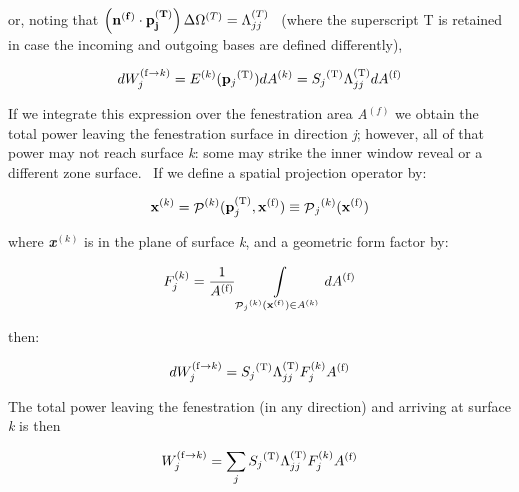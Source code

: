 or, noting that \(\left(\bf{n}^{(f)}\cdot\bf{p}_j^{(T)}\right) \Delta\Omega^{(T)} = \Lambda_{jj}^{(T)}\) ~(where the superscript T is retained in case the incoming and outgoing bases are defined differently),

\begin{equation}
dW_j^{{\rm{(f}} \to k{\rm{)}}} = {E^{{\rm{(}}k{\rm{)}}}}({{\bf{p}}_j}^{{\rm{(T)}}})d{A^{{\rm{(}}k{\rm{)}}}} = {S_j}^{{\rm{(T)}}}\Lambda_{jj}^{{\rm{(T)}}}d{A^{{\rm{(f)}}}}
\end{equation}

If we integrate this expression over the fenestration area \emph{A}\(^{(f)}\) we obtain the total power leaving the fenestration surface in direction \emph{j}; however, all of that power may not reach surface \emph{k}: some may strike the inner window reveal or a different zone surface.~ If we define a spatial projection operator by:

\begin{equation}
{{\bf{x}}^{{\rm{(}}k{\rm{)}}}} = {{\mathop{\rm \mathcal{P}}\nolimits} ^{{\rm{(}}k{\rm{)}}}}({\bf{p}}_j^{{\rm{(T)}}},{{\bf{x}}^{{\rm{(f)}}}}) \equiv {{\mathop{\rm \mathcal{P}}\nolimits}_j}^{{\rm{(}}k{\rm{)}}}({{\bf{x}}^{{\rm{(f)}}}})
\end{equation}

where \textbf{\emph{x}}\(^{(k)}\) is in the plane of surface \emph{k}, and a geometric form factor by:

\begin{equation}
F_j^{{\rm{(}}k{\rm{)}}} = \frac{1}{{{A^{{\rm{(f)}}}}}}\int\limits_{{{\mathop{\rm \mathcal{P}}\nolimits}_j}^{{\rm{(}}k{\rm{)}}}({{\bf{x}}^{{\rm{(f)}}}}) \in {A^{{\rm{(}}k{\rm{)}}}}} {d{A^{{\rm{(f)}}}}}
\end{equation}

then:

\begin{equation}
dW_j^{{\rm{(f}} \to k{\rm{)}}} = {S_j}^{{\rm{(T)}}}\Lambda_{jj}^{{\rm{(T)}}}F_j^{{\rm{(}}k{\rm{)}}}{A^{{\rm{(f)}}}}
\end{equation}

The total power leaving the fenestration (in any direction) and arriving at surface \emph{k} is then

\begin{equation}
W_j^{{\rm{(f}} \to k{\rm{)}}} = \sum\limits_j {{S_j}^{{\rm{(T)}}}\Lambda_{jj}^{{\rm{(T)}}}F_j^{{\rm{(}}k{\rm{)}}}{A^{{\rm{(f)}}}}}
\label{eq:WjftokEquation}
\end{equation}

